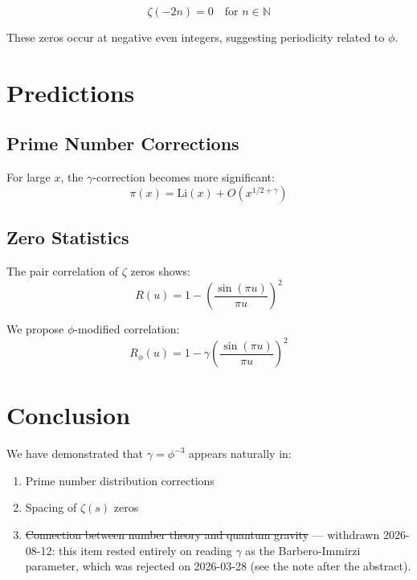 \documentclass[12pt,a4paper]{article}
\begin{document}
\begin{equation}
\zeta(-2n) = 0 \quad \text{for } n \in \mathbb{N}
\end{equation}

These zeros occur at negative even integers, suggesting periodicity related to $\phi$.

\section{Predictions}

\subsection{Prime Number Corrections}

For large $x$, the $\gamma$-correction becomes more significant:
\begin{equation}
\pi(x) = \text{Li}(x) + O(x^{1/2+\gamma})
\end{equation}

\subsection{Zero Statistics}

The pair correlation of $\zeta$ zeros shows:
\begin{equation}
R(u) = 1 - \left(\frac{\sin(\pi u)}{\pi u}\right)^2
\end{equation}

We propose $\phi$-modified correlation:
\begin{equation}
R_\phi(u) = 1 - \gamma \left(\frac{\sin(\pi u)}{\pi u}\right)^2
\end{equation}

\section{Conclusion}

We have demonstrated that $\gamma = \phi^{-3}$ appears naturally in:
\begin{enumerate}
\item Prime number distribution corrections
\item Spacing of $\zeta(s)$ zeros
\item \sout{Connection between number theory and quantum gravity} --- withdrawn 2026-08-12: this item rested entirely on reading $\gamma$ as the Barbero-Immirzi parameter, which was rejected on 2026-03-28 (see the note after the abstract).
\end{enumerate}
\end{document}
